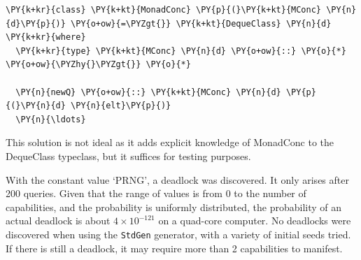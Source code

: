 

\begin{Verbatim}[commandchars=\\\{\}]
\PY{k+kr}{class} \PY{k+kt}{MonadConc} \PY{p}{(}\PY{k+kt}{MConc} \PY{n}{d}\PY{p}{)} \PY{o+ow}{=\PYZgt{}} \PY{k+kt}{DequeClass} \PY{n}{d} \PY{k+kr}{where}
  \PY{k+kr}{type} \PY{k+kt}{MConc} \PY{n}{d} \PY{o+ow}{::} \PY{o}{*} \PY{o+ow}{\PYZhy{}\PYZgt{}} \PY{o}{*}

  \PY{n}{newQ} \PY{o+ow}{::} \PY{k+kt}{MConc} \PY{n}{d} \PY{p}{(}\PY{n}{d} \PY{n}{elt}\PY{p}{)}
  \PY{n}{\ldots}
\end{Verbatim}

This solution is not ideal as it adds explicit knowledge of MonadConc
to the DequeClass typeclass, but it suffices for testing purposes.

With the constant value `PRNG', a deadlock was discovered. It only
arises after 200 queries. Given that the range of values is from 0 to
the number of capabilities, and the probability is uniformly
distributed, the probability of an actual deadlock is about $4 \times
10^{-121}$ on a quad-core computer. No deadlocks were discovered when
using the \texttt{StdGen} generator, with a variety of initial seeds
tried. If there is still a deadlock, it may require more than 2
capabilities to manifest.

